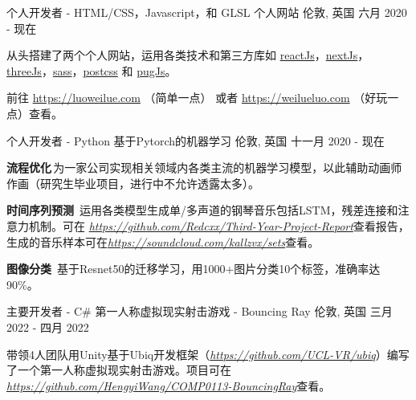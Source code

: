 

\begin{cventries}

  \cventry
    {个人开发者 - HTML/CSS，Javascript，和 GLSL} %
    {个人网站} %
    {伦敦, 英国} %
    {六月 2020 - 现在} %
    {
      \begin{cvitems} %
        \item {从头搭建了两个个人网站，运用各类技术和第三方库如 \href{https://reactjs.org/}{reactJs}，\href{https://nextjs.org/}{nextJs}，\href{https://threejs.org/}{threeJs}，\href{https://sass-lang.com/}{sass}，\href{https://postcss.org/}{postcss} 和 \href{https://pugjs.org/api/getting-started.html}{pugJs}。}
        \item 前往 \url{https://luoweilue.com} （简单一点） 或者 \url{https://weilueluo.com} （好玩一点）查看。
      \end{cvitems}
    }
    
  \cventry
    {个人开发者 - Python} %
    {基于Pytorch的机器学习} %
    {伦敦, 英国} %
    {十一月 2020 - 现在} %
    {
      \begin{cvitems} %
      \item {\textbf{流程优化}\,为一家公司实现相关领域内各类主流的机器学习模型，以此辅助动画师作画（研究生毕业项目，进行中不允许透露太多）。}
      \item {\textbf{时间序列预测}\, 运用各类模型生成单/多声道的钢琴音乐包括LSTM，残差连接和注意力机制。可在 \href{https://github.com/Redcxx/Third-Year-Project-Report}{\textit{https://github.com/Redcxx/Third-Year-Project-Report}}查看报告，生成的音乐样本可在\href{https://soundcloud.com/kallzvx/sets}{\textit{https://soundcloud.com/kallzvx/sets}}查看。}
      \item {\textbf{图像分类}\, 基于Resnet50的迁移学习，用1000+图片分类10个标签，准确率达90\%。}
      \end{cvitems}
    }
    
  \cventry
    {主要开发者 - C\#} %
    {第一人称虚拟现实射击游戏 - Bouncing Ray} %
    {伦敦, 英国} %
    {三月 2022 - 四月 2022} %
    {
      \begin{cvitems} %
        \item {带领4人团队用Unity基于Ubiq开发框架（\href{https://github.com/UCL-VR/ubiq}{\textit{https://github.com/UCL-VR/ubiq}}）编写了一个第一人称虚拟现实射击游戏。项目可在 \href{https://github.com/HengyiWang/COMP0113-BouncingRay}{\textit{https://github.com/HengyiWang/COMP0113-BouncingRay}}查看。}
      \end{cvitems}
    }
  

\end{cventries}
